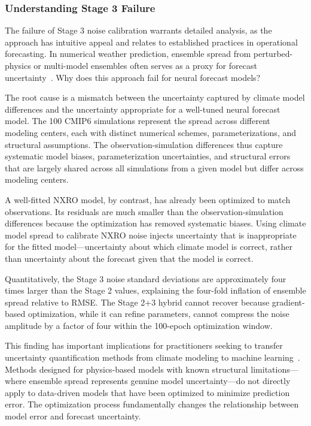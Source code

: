 \subsubsection{Understanding Stage 3 Failure}

The failure of Stage 3 noise calibration warrants detailed analysis, as the approach has intuitive appeal and relates to established practices in operational forecasting. In numerical weather prediction, ensemble spread from perturbed-physics or multi-model ensembles often serves as a proxy for forecast uncertainty~\cite{berner2017stochastic}. Why does this approach fail for neural forecast models?

The root cause is a mismatch between the uncertainty captured by climate model differences and the uncertainty appropriate for a well-tuned neural forecast model. The 100 CMIP6 simulations represent the spread across different modeling centers, each with distinct numerical schemes, parameterizations, and structural assumptions. The observation-simulation differences thus capture systematic model biases, parameterization uncertainties, and structural errors that are largely shared across all simulations from a given model but differ across modeling centers.

A well-fitted NXRO model, by contrast, has already been optimized to match observations. Its residuals are much smaller than the observation-simulation differences because the optimization has removed systematic biases. Using climate model spread to calibrate NXRO noise injects uncertainty that is inappropriate for the fitted model---uncertainty about which climate model is correct, rather than uncertainty about the forecast given that the model is correct.

Quantitatively, the Stage 3 noise standard deviations are approximately four times larger than the Stage 2 values, explaining the four-fold inflation of ensemble spread relative to RMSE. The Stage 2+3 hybrid cannot recover because gradient-based optimization, while it can refine parameters, cannot compress the noise amplitude by a factor of four within the 100-epoch optimization window.

This finding has important implications for practitioners seeking to transfer uncertainty quantification methods from climate modeling to machine learning~\cite{christensen2022machine}. Methods designed for physics-based models with known structural limitations---where ensemble spread represents genuine model uncertainty---do not directly apply to data-driven models that have been optimized to minimize prediction error. The optimization process fundamentally changes the relationship between model error and forecast uncertainty.

